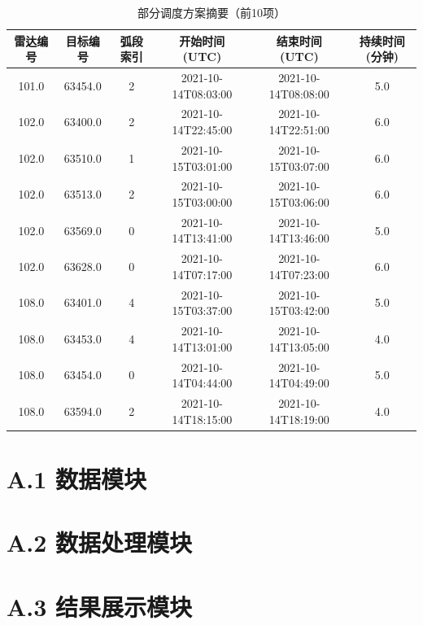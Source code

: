 \documentclass[openany,12pt,UTF8]{ctexart}
\begin{document}
\begin{table}
    \centering
    \caption{部分调度方案摘要（前10项）}
    \label{tab:schedule_summary}
    \begin{tabular}{|c|c|c|c|c|c|}
        \hline
        \textbf{雷达编号} & \textbf{目标编号} & \textbf{弧段索引} & \textbf{开始时间 (UTC)} & \textbf{结束时间 (UTC)} & \textbf{持续时间 (分钟)} \\
        \hline
        101.0         & 63454.0       & 2             & 2021-10-14T08:03:00 & 2021-10-14T08:08:00 & 5.0                \\
        \hline
        102.0         & 63400.0       & 2             & 2021-10-14T22:45:00 & 2021-10-14T22:51:00 & 6.0                \\
        \hline
        102.0         & 63510.0       & 1             & 2021-10-15T03:01:00 & 2021-10-15T03:07:00 & 6.0                \\
        \hline
        102.0         & 63513.0       & 2             & 2021-10-15T03:00:00 & 2021-10-15T03:06:00 & 6.0                \\
        \hline
        102.0         & 63569.0       & 0             & 2021-10-14T13:41:00 & 2021-10-14T13:46:00 & 5.0                \\
        \hline
        102.0         & 63628.0       & 0             & 2021-10-14T07:17:00 & 2021-10-14T07:23:00 & 6.0                \\
        \hline
        108.0         & 63401.0       & 4             & 2021-10-15T03:37:00 & 2021-10-15T03:42:00 & 5.0                \\
        \hline
        108.0         & 63453.0       & 4             & 2021-10-14T13:01:00 & 2021-10-14T13:05:00 & 4.0                \\
        \hline
        108.0         & 63454.0       & 0             & 2021-10-14T04:44:00 & 2021-10-14T04:49:00 & 5.0                \\
        \hline
        108.0         & 63594.0       & 2             & 2021-10-14T18:15:00 & 2021-10-14T18:19:00 & 4.0                \\
        \hline
    \end{tabular}
\end{table}

\newpage
\section*{A.1 数据模块}


\newpage
\section*{A.2 数据处理模块}


\newpage
\section*{A.3 结果展示模块}

\end{document}

